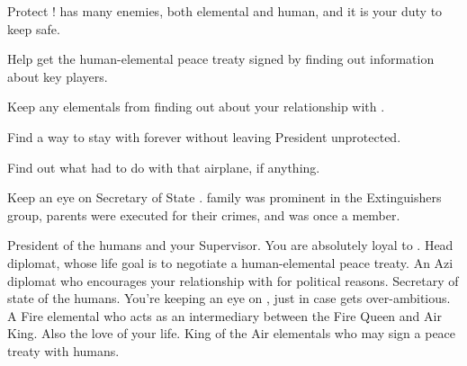 \documentclass[char]{elementals}
\begin{document}
\begin{itemz}[Goals]
  \item Protect \cLeader{}!  \cLeader{\They} has many enemies, both elemental and human, and it is your duty to keep \cLeader{\them} safe.
  \item Help \cLeader{} get the human-elemental peace treaty signed by finding out information about key players.
  \item Keep any elementals from finding out about your relationship with \cJuliet{}.
  \item Find a way to stay with \cJuliet{} forever without leaving President \cLeader{} unprotected.
  \item Find out what \cJuliet{} had to do with that airplane, if anything.
  \item Keep an eye on Secretary of State \cDema{}.  \cDema{\Their} family was prominent in the Extinguishers group, \cDema{\their} parents were executed for their crimes, and 
  \cDema{\they} \cDema{\themself} was once a member.
\end{itemz}

\begin{contacts}
  \contact{\cLeader{}} President of the humans and your Supervisor.  You are absolutely loyal to \cLeader{\them}.
  \contact{\cAvatar{}} Head diplomat, whose life goal is to negotiate a human-elemental peace treaty.
  \contact{\cDiplomat{}} An Azi diplomat who encourages your relationship with \cJuliet{} for political reasons.
  \contact{\cDema{}} Secretary of state of the humans.  You're keeping an eye on \cDema{\them}, just in case \cDema{\they} gets over-ambitious.
  \contact{\cJuliet{}} A Fire elemental who acts as an intermediary between the Fire Queen and Air King.  Also the love of your life.
  \contact{\cKing{}} King of the Air elementals who may sign a peace treaty with humans.
\end{contacts}
\end{document}
